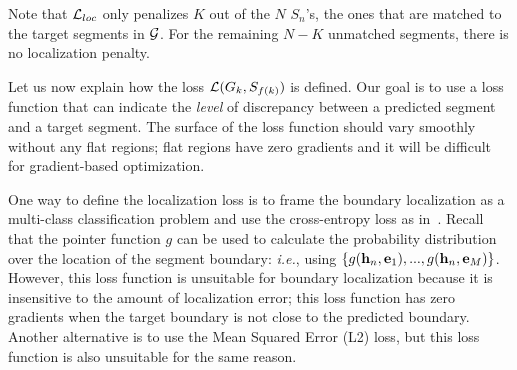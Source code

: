 \documentclass[10pt,journal,compsoc]{IEEEtran}
\begin{document}
Note that $\mathcal{L}_{loc}$ only penalizes $K$ out of the $N$ $S_n$'s, the ones that are matched to the target segments in $\mathcal{G}$. For the remaining $N-K$ unmatched segments, there is no localization penalty. 




 Let us now explain how the loss $\mathcal{L}(G_k, S_{f(k)})$ is defined. Our goal is to use a loss function that can indicate the {\em level} of discrepancy between a predicted segment and a target segment. The surface of the loss function should vary smoothly without any flat regions; flat regions have zero gradients and it will be difficult for gradient-based optimization.

One way to define the localization loss is to frame the boundary localization as a multi-class classification problem and use the cross-entropy loss as in~\cite{vinyals2015pointer}.  Recall that the pointer function $g$ can be used to calculate the probability distribution over the location of the segment boundary: \emph{i.e.}, using $\{g({\bf h}_n, {\bf e}_1), ..., g({\bf h}_n, {\bf e}_M)\}$. However, this loss function is unsuitable for boundary localization because it is insensitive to the amount of localization error; this loss function has zero gradients when the target boundary is not close to the predicted boundary. Another alternative is to use the Mean Squared Error (L2) loss, but this loss function is also unsuitable for the same reason. 
\end{document}
